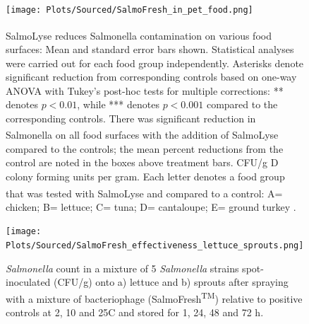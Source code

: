 \begin{figure}[ht!]
    \centering
    \texttt{[image: Plots/Sourced/SalmoFresh\_in\_pet\_food.png]}
    \caption{SalmoLyse\textsuperscript{\textregistered} reduces Salmonella contamination on various food surfaces: Mean and standard error bars shown.
        Statistical analyses were carried out for each food group independently.
        Asterisks denote significant reduction from corresponding controls based on one-way ANOVA with Tukey's post-hoc tests for multiple corrections: ** denotes $p < 0.01$, while *** denotes $p < 0.001$ compared to the corresponding controls.
        There was significant reduction in Salmonella on all food surfaces with the addition of SalmoLyse\textsuperscript{\textregistered} compared to the controls; the mean percent reductions from the control are noted in the boxes above treatment bars.
        CFU/g D colony forming units per gram.
        Each letter denotes a food group that was tested with SalmoLyse\textsuperscript{\textregistered} and compared to a control: A= chicken; B= lettuce; C= tuna; D= cantaloupe; E= ground turkey \cite{sofferBacteriophagesSafelyReduce2016}. 
    }
    \label{fig:SalmoFresh_pet_food}
\end{figure}

\begin{figure}[ht!]
    \centering
    \texttt{[image: Plots/Sourced/SalmoFresh\_effectiveness\_lettuce\_sprouts.png]}
    \caption{\textit{Salmonella} count in a mixture of 5 \textit{Salmonella} strains spot-inoculated (CFU/g) onto a) lettuce and b) sprouts after spraying with a mixture of bacteriophage (SalmoFresh\textsuperscript{TM}) relative to positive controls at 2, 10 and 25C and stored for 1, 24, 48 and 72 h. \cite{zhangSalmoFreshEffectivenessControlling2019}}
    \label{fig:SalmoFresh_lettuce}
\end{figure}


